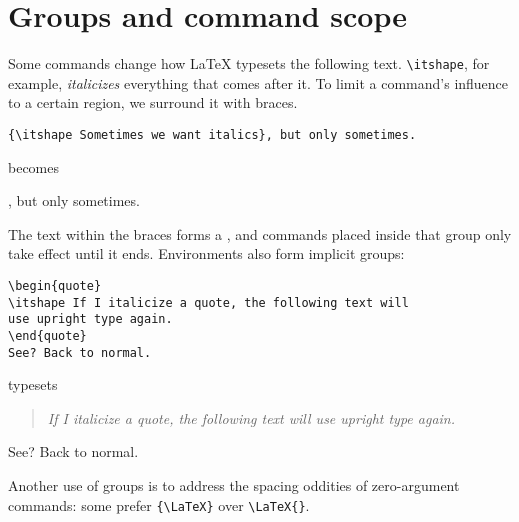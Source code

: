 \section{Groups and command scope}
Some commands change how \LaTeX{} typesets the following text.
\verb|\itshape|, for example, \textit{italicizes} everything that comes after it.
To limit a command's influence to a certain region, we surround it with braces.
\begin{leftfigure}
\begin{lstlisting}
{\itshape Sometimes we want italics}, but only sometimes.
\end{lstlisting}
\end{leftfigure}
becomes
\begin{leftfigure}
, but only sometimes.
\end{leftfigure}
The text within the braces forms a ,
and commands placed inside that group only take effect until it ends.
Environments also form implicit groups:
\begin{leftfigure}
\begin{lstlisting}
\begin{quote}
\itshape If I italicize a quote, the following text will
use upright type again.
\end{quote}
See? Back to normal.
\end{lstlisting}
\end{leftfigure}
typesets
\begin{leftfigure}
\lm
\begin{quote}
\itshape If I italicize a quote, the following text will
use upright type again.
\end{quote}
See? Back to normal.
\end{leftfigure}
Another use of groups is to address the spacing oddities of zero-argument
commands: some prefer \verb|{\LaTeX}| over \verb|\LaTeX{}|.
